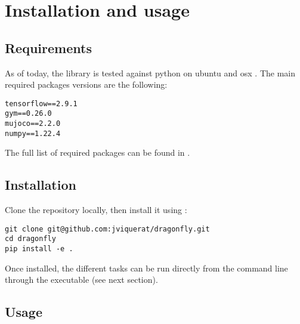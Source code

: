 \chapter{Installation and usage}

\section{Requirements}

As of today, the library is tested against python  on ubuntu  and osx . The main required packages versions are the following:

\begin{verbatim}
tensorflow==2.9.1
gym==0.26.0
mujoco==2.2.0
numpy==1.22.4
\end{verbatim}

The full list of required packages can be found in .

\section{Installation}

Clone the repository locally, then install it using :

\begin{verbatim}
git clone git@github.com:jviquerat/dragonfly.git
cd dragonfly
pip install -e .
\end{verbatim}

Once installed, the different tasks can be run directly from the command line through the  executable (see next section).

\section{Usage}

